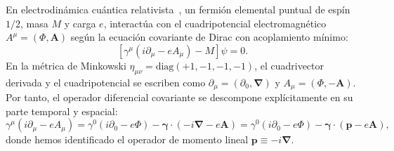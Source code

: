 \documentclass[10pt,a4paper]{article}
\begin{document}
En electrodinámica cuántica relativista~\cite{dirac1928,griffiths2008,thomson2013}, un fermión elemental puntual de espín $1/2$, masa $M$ y carga $e$, interactúa con el cuadripotencial electromagnético $A^\mu = (\Phi, \mathbf{A})$ según la ecuación covariante de Dirac con acoplamiento mínimo:
\begin{equation}
\left[ \gamma^\mu (i\partial_\mu - e A_\mu) - M \right] \psi = 0.
\label{eq:dirac_min_coupling}
\end{equation}
En la métrica de Minkowski $\eta_{\mu\nu} = \text{diag}(+1, -1, -1, -1)$, el cuadrivector derivada y el cuadripotencial se escriben como $\partial_\mu = (\partial_0, \boldsymbol{\nabla})$ y $A_\mu = (\Phi, -\mathbf{A})$. Por tanto, el operador diferencial covariante se descompone explícitamente en su parte temporal y espacial:
\begin{equation}
\gamma^\mu (i\partial_\mu - e A_\mu) = \gamma^0 (i\partial_0 - e\Phi) - \boldsymbol{\gamma} \cdot (-i\boldsymbol{\nabla} - e\mathbf{A}) = \gamma^0 (i\partial_0 - e\Phi) - \boldsymbol{\gamma} \cdot (\mathbf{p} - e\mathbf{A}),
\end{equation}
donde hemos identificado el operador de momento lineal $\mathbf{p} \equiv -i\boldsymbol{\nabla}$.
\end{document}
